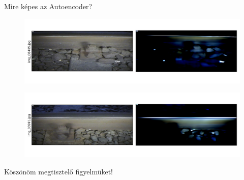 \documentclass[aspectratio=169]{beamer}
\begin{document}
\begin{frame}{Mire képes az Autoencoder?}

    \begin{figure}
        \centering
        \includegraphics[width=\columnwidth,trim={0 1cm 0 1cm},clip]{./results/vgg19_vgg19/20230510_172958_predict_0.png}
    \end{figure}

    \begin{figure}
        \centering
        \includegraphics[width=\columnwidth,trim={0 1cm 0 1cm},clip]{./results/vgg19_bn_vgg19/20230525_045131_predict_0.png}
    \end{figure}
\end{frame}

\begin{frame}
    \centering \Large
    Köszönöm megtisztelő figyelmüket!
\end{frame}
\end{document}
